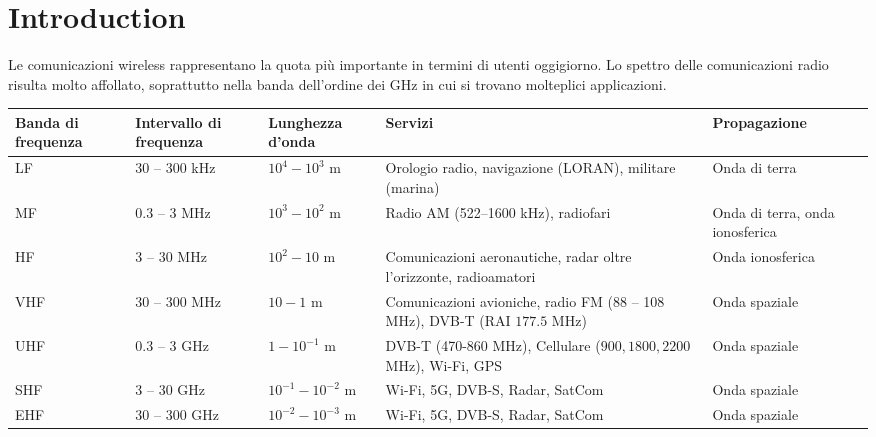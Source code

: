 \section*{Introduction}


Le comunicazioni wireless rappresentano la quota più importante in termini di utenti oggigiorno. Lo spettro delle comunicazioni radio risulta molto affollato, soprattutto nella banda dell'ordine dei GHz in cui si trovano molteplici applicazioni.

\begin{table}[h!]
\centering
\begin{tabular}{ | m{2cm} | m{3cm} | m{2.5cm} | m{4cm} | m{2.5cm} | }
\hline
Banda di frequenza & Intervallo di frequenza & Lunghezza d'onda & Servizi & Propagazione \\
\hline
LF & 30 -- 300 kHz & \(10^{4} - 10^{3}\) m & Orologio radio, navigazione (LORAN), militare (marina) & Onda di terra \\
\hline
MF & 0.3 -- 3 MHz & \(10^{3} - 10^{2}\) m & Radio AM (522--1600 kHz), radiofari & Onda di terra, onda ionosferica \\
\hline
HF & 3 -- 30 MHz & \(10^{2} - 10\) m & Comunicazioni aeronautiche, radar oltre l'orizzonte, radioamatori & Onda ionosferica \\
\hline
VHF & 30 -- 300 MHz & \(10 - 1\) m & Comunicazioni avioniche, radio FM (88 -- 108 MHz), DVB-T (RAI \(177.5\) MHz) & Onda spaziale \\
\hline
UHF & 0.3 -- 3 GHz & \(1 - 10^{-1}\) m & DVB-T (470-860 MHz), Cellulare (\(900,1800,2200\) MHz), Wi-Fi, GPS & Onda spaziale \\
\hline
SHF & 3 -- 30 GHz & \(10^{-1} - 10^{-2}\) m & Wi-Fi, 5G, DVB-S, Radar, SatCom & Onda spaziale \\
\hline
EHF & 30 -- 300 GHz & \(10^{-2} - 10^{-3}\) m & Wi-Fi, 5G, DVB-S, Radar, SatCom & Onda spaziale \\
\hline
\end{tabular}
\end{table}

